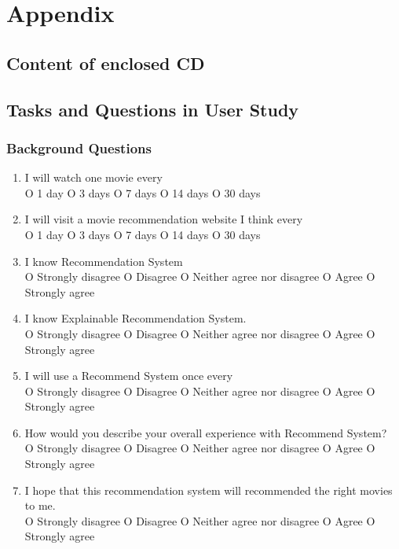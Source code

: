 \section{Appendix}
\label{ch:appendix}

\subsection{Content of enclosed CD}
\subsection{Tasks and Questions in User Study}
\subsubsection{Background Questions}

\begin{enumerate}

\item  I will watch one movie every\\

O 1 day  O 3 days O 7 days O 14 days O 30 days

\item  I will visit a movie recommendation website I think every\\

O 1 day  O 3 days O 7 days O 14 days O 30 days

\item  I know Recommendation System\\

O Strongly disagree O Disagree O Neither agree nor disagree O Agree O Strongly agree

\item  I know Explainable Recommendation System.\\

O Strongly disagree O Disagree O Neither agree nor disagree O Agree O Strongly agree

\item  I will use a Recommend System once every\\

O Strongly disagree O Disagree O Neither agree nor disagree O Agree O Strongly agree

\item  How would you describe your overall experience with Recommend System?\\

O Strongly disagree O Disagree O Neither agree nor disagree O Agree O Strongly agree

\item  I hope that this recommendation system will recommended the right movies to me.\\

O Strongly disagree O Disagree O Neither agree nor disagree O Agree O Strongly agree

\end{enumerate}

